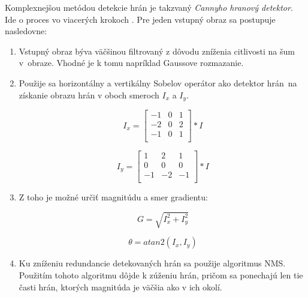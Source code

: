     Komplexnejšou metódou detekcie hrán je takzvaný \emph{Cannyho hranový detektor}. Ide o proces vo viacerých krokoch \cite{Samina2023}. Pre jeden vstupný obraz sa postupuje nasledovne:

    \begin{enumerate}
        \item Vstupný obraz býva väčšinou filtrovaný z dôvodu zníženia citlivosti na šum v~obraze. Vhodné je k tomu napríklad Gaussove rozmazanie.
        
        \item Použije sa horizontálny a vertikálny Sobelov operátor ako detektor hrán~na získanie obrazu hrán v oboch smeroch \(I_{x}\) a \(I_{y}\).

        \begin{minipage}[b]{0.4\textwidth}
            \[I_{x} = 
            \begin{bmatrix}
                -1 & 0 & 1 \\
                -2 & 0 & 2 \\
                -1 & 0 & 1 \\
            \end{bmatrix}
            \ast I
            \]
        \end{minipage}
        \begin{minipage}[b]{0.4\textwidth}
            \[I_{y} = 
            \begin{bmatrix}
                 1 &  2 &  1 \\
                 0 &  0 &  0 \\
                -1 & -2 & -1 \\
            \end{bmatrix}
            \ast I
            \]
        \end{minipage}

        \item Z toho je možné určiť magnitúdu a smer gradientu:
        
        \begin{minipage}[b]{0.4\textwidth}
            \[G = \sqrt{I_x^2 + I_y^2}\]
        \end{minipage}
        \begin{minipage}[b]{0.4\textwidth}
            \[\theta = atan2(I_x, I_y)\]
        \end{minipage}
        
        \item Ku zníženiu redundancie detekovaných hrán sa použije algoritmus \ac{NMS}. Použitím tohoto algoritmu dôjde k zúženiu hrán, pričom sa ponechajú len tie časti hrán, ktorých magnitúda je väčšia ako v ich okolí.
        

\end{enumerate}

